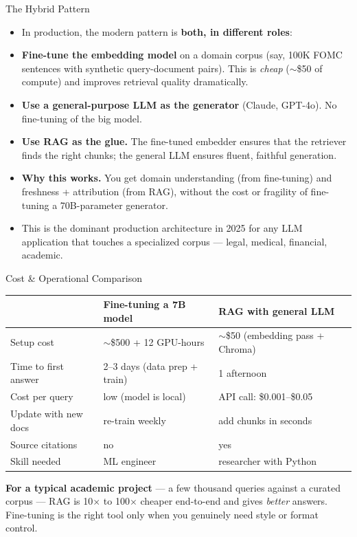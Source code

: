 \documentclass[10pt,english,aspectratio=169]{beamer}
\begin{document}
\begin{frame}{The Hybrid Pattern}
\begin{itemize}
\item In production, the modern pattern is \textbf{both, in different roles}:

\medskip
\item \textbf{Fine-tune the embedding model} on a domain corpus (say, 100K FOMC sentences with synthetic query-document pairs). This is \emph{cheap} ($\sim$\$50 of compute) and improves retrieval quality dramatically.

\medskip
\item \textbf{Use a general-purpose LLM as the generator} (Claude, GPT-4o). No fine-tuning of the big model.

\medskip
\item \textbf{Use RAG as the glue.} The fine-tuned embedder ensures that the retriever finds the right chunks; the general LLM ensures fluent, faithful generation.

\medskip
\item \textbf{Why this works.} You get domain understanding (from fine-tuning) and freshness + attribution (from RAG), without the cost or fragility of fine-tuning a 70B-parameter generator.

\medskip
\item This is the dominant production architecture in 2025 for any LLM application that touches a specialized corpus --- legal, medical, financial, academic.
\end{itemize}
\end{frame}

\begin{frame}{Cost \& Operational Comparison}
\begin{center}
\renewcommand{\arraystretch}{1.35}
\small
\begin{tabular}{|p{4.0cm}|p{4.2cm}|p{4.5cm}|}
\hline
& \textbf{Fine-tuning a 7B model} & \textbf{RAG with general LLM} \\
\hline
Setup cost & $\sim$\$500 + 12 GPU-hours & $\sim$\$50 (embedding pass + Chroma) \\
\hline
Time to first answer & 2--3 days (data prep + train) & 1 afternoon \\
\hline
Cost per query & low (model is local) & API call: \$0.001--\$0.05 \\
\hline
Update with new docs & re-train weekly & add chunks in seconds \\
\hline
Source citations & no & yes \\
\hline
Skill needed & ML engineer & researcher with Python \\
\hline
\end{tabular}
\end{center}

\bigskip
\textbf{For a typical academic project} --- a few thousand queries against a curated corpus --- RAG is 10$\times$ to 100$\times$ cheaper end-to-end and gives \emph{better} answers. Fine-tuning is the right tool only when you genuinely need style or format control.
\end{frame}
\end{document}
